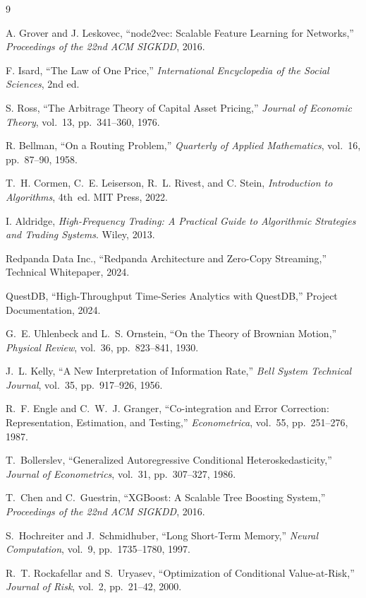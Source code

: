 \documentclass[letterpaper,11pt]{report}
\begin{document}
\begin{thebibliography}{9}

A. Grover and J. Leskovec, ``node2vec: Scalable Feature Learning for Networks,'' \emph{Proceedings of the 22nd ACM SIGKDD}, 2016.

F. Isard, ``The Law of One Price,'' \emph{International Encyclopedia of the Social Sciences}, 2nd ed.

S. Ross, ``The Arbitrage Theory of Capital Asset Pricing,'' \emph{Journal of Economic Theory}, vol.~13, pp.~341--360, 1976.

R. Bellman, ``On a Routing Problem,'' \emph{Quarterly of Applied Mathematics}, vol.~16, pp.~87--90, 1958.

T.~H. Cormen, C.~E. Leiserson, R.~L. Rivest, and C. Stein, \emph{Introduction to Algorithms}, 4th~ed. MIT Press, 2022.

I. Aldridge, \emph{High-Frequency Trading: A Practical Guide to Algorithmic Strategies and Trading Systems}. Wiley, 2013.

Redpanda Data Inc., ``Redpanda Architecture and Zero-Copy Streaming,'' Technical Whitepaper, 2024.

QuestDB, ``High-Throughput Time-Series Analytics with QuestDB,'' Project Documentation, 2024.

G.~E. Uhlenbeck and L.~S. Ornstein, ``On the Theory of Brownian Motion,'' \emph{Physical Review}, vol.~36, pp.~823--841, 1930.

J.~L. Kelly, ``A New Interpretation of Information Rate,'' \emph{Bell System Technical Journal}, vol.~35, pp.~917--926, 1956.

R.~F. Engle and C.~W.~J. Granger, ``Co-integration and Error Correction: Representation, Estimation, and Testing,'' \emph{Econometrica}, vol.~55, pp.~251--276, 1987.

T.~Bollerslev, ``Generalized Autoregressive Conditional Heteroskedasticity,'' \emph{Journal of Econometrics}, vol.~31, pp.~307--327, 1986.

T.~Chen and C.~Guestrin, ``XGBoost: A Scalable Tree Boosting System,'' \emph{Proceedings of the 22nd ACM SIGKDD}, 2016.

S.~Hochreiter and J.~Schmidhuber, ``Long Short-Term Memory,'' \emph{Neural Computation}, vol.~9, pp.~1735--1780, 1997.

R.~T. Rockafellar and S.~Uryasev, ``Optimization of Conditional Value-at-Risk,'' \emph{Journal of Risk}, vol.~2, pp.~21--42, 2000.

\end{thebibliography}
\end{document}

